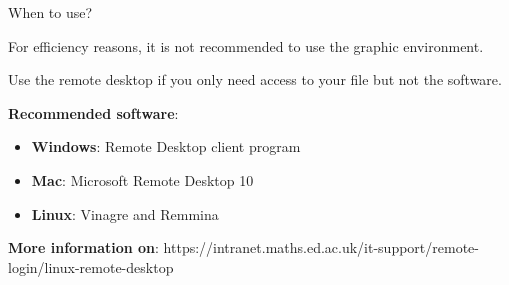 \documentclass[10pt]{beamer}
\begin{document}
\begin{frame}[fragile]{When to use? }

For efficiency reasons, it is not recommended to use the graphic environment. 

Use the remote desktop if you only need access to your file but not the software.

\textbf{Recommended software}: 

\begin{itemize}
    \item \textbf{Windows}: Remote Desktop client program
    \item \textbf{Mac}: Microsoft Remote Desktop 10
    \item \textbf{Linux}: Vinagre and Remmina
\end{itemize}

\hfill

\scriptsize{\textbf{More information on}: https://intranet.maths.ed.ac.uk/it-support/remote-login/linux-remote-desktop}

\end{frame}
\end{document}
